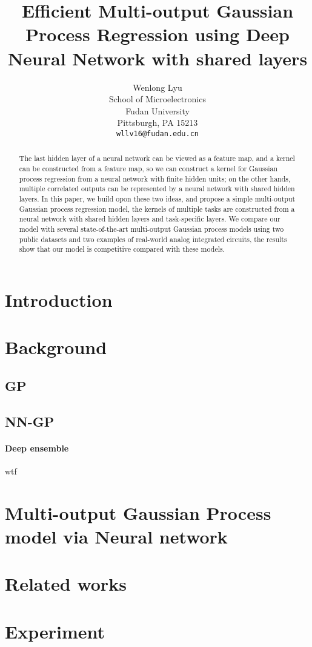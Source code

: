 \documentclass{article}
\title{Efficient Multi-output Gaussian Process Regression using Deep Neural Network with shared layers}
\author{
  Wenlong Lyu \\
  School of Microelectronics\\
  Fudan University\\
  Pittsburgh, PA 15213 \\
  \texttt{wllv16@fudan.edu.cn} \\
}
\begin{document}

\maketitle

\begin{abstract} 
    The last hidden layer of a neural network can be viewed as a feature map,
    and a kernel can be constructed from a feature map, so we can construct a
    kernel for Gaussian process regression from a neural network with finite
    hidden units; on the other hands, multiple correlated outputs can be
    represented by a neural network with shared hidden layers. In this paper,
    we build opon these two ideas, and propose a simple multi-output Gaussian
    process regression model, the kernels of multiple tasks are constructed
    from a neural network with shared hidden layers and task-specific layers.
    We compare our model with several state-of-the-art multi-output Gaussian
    process models using two public datasets and two examples of real-world
    analog integrated circuits, the results show that our model is competitive
    compared with these models.
\end{abstract}

\section{Introduction}

\section{Background}

\subsection{GP}

\subsection{NN-GP}

\paragraph{Deep ensemble} wtf

\section{Multi-output Gaussian Process model via Neural network}

\section{Related works}


\section{Experiment}
\end{document}
